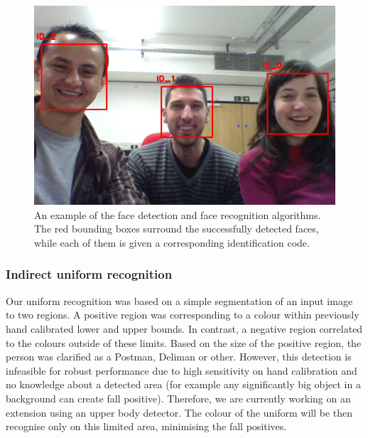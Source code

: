 \begin{figure}[!t]
\centering
\includegraphics[width=3.in]{BARC_FaceRec.png}
\caption{An example of the face detection and face recognition algorithms. The red bounding boxes surround the successfully detected faces, while each of them is given a corresponding identification code.}
\label{fig:face}
\end{figure}

\subsubsection{Indirect uniform recognition}

Our uniform recognition was based on a simple segmentation of an input image to two regions. 
A positive region was corresponding to a colour within previously hand calibrated lower and upper bounds. 
In contrast, a negative region correlated to the colours outside of these limits. 
Based on the size of the positive region, the person was clarified as a Postman, Deliman or other. 
However, this detection is infeasible for robust performance due to high sensitivity on hand calibration and no knowledge about a detected area (for example any significantly big object in a background can create fall positive). 
Therefore, we are currently working on an extension using an upper body detector. 
The colour of the uniform will be then recognise only on this limited area, minimising the fall positives.













